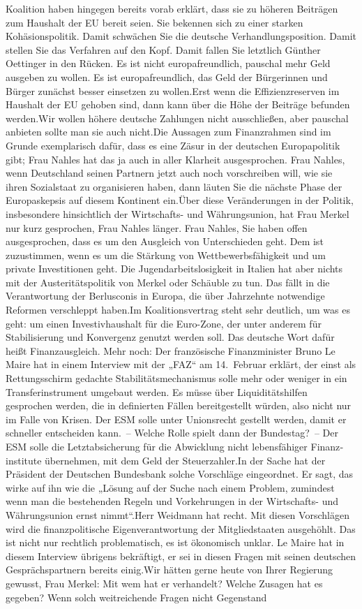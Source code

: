 \documentclass{article}
\begin{document}
Koalition haben hingegen bereits vorab erklärt, dass sie zu höheren Beiträgen zum Haushalt der EU bereit seien. Sie bekennen sich zu einer starken Kohäsionspolitik. Damit schwächen Sie die deutsche Verhandlungsposition. Damit stellen Sie das Verfahren auf den Kopf. Damit fallen Sie letztlich Günther Oettinger in den Rücken. Es ist nicht europafreundlich, pauschal mehr Geld ausgeben zu wollen. Es ist europafreundlich, das Geld der Bürgerinnen und Bürger zunächst besser einsetzen zu wollen.Erst wenn die Effizienzreserven im Haushalt der EU gehoben sind, dann kann über die Höhe der Beiträge befunden werden.Wir wollen höhere deutsche Zahlungen nicht ausschließen, aber pauschal anbieten sollte man sie auch nicht.Die Aussagen zum Finanzrahmen sind im Grunde exemplarisch dafür, dass es eine Zäsur in der deutschen Europapolitik gibt; Frau Nahles hat das ja auch in aller Klarheit ausgesprochen. Frau Nahles, wenn Deutschland seinen Partnern jetzt auch noch vorschreiben will, wie sie ihren Sozialstaat zu organisieren haben, dann läuten Sie die nächste Phase der Europaskepsis auf diesem Kontinent ein.Über diese Veränderungen in der Politik, insbesondere hinsichtlich der Wirtschafts- und Währungsunion, hat Frau Merkel nur kurz gesprochen, Frau Nahles länger. Frau Nahles, Sie haben offen ausgesprochen, dass es um den Ausgleich von Unterschieden geht. Dem ist zuzustimmen, wenn es um die Stärkung von Wettbewerbsfähigkeit und um private Investitionen geht. Die Jugendarbeitslosigkeit in Italien hat aber nichts mit der Austeritätspolitik von Merkel oder Schäuble zu tun. Das fällt in die Verantwortung der Berlusconis in Europa, die über Jahrzehnte notwendige Reformen verschleppt haben.Im Koalitionsvertrag steht sehr deutlich, um was es geht: um einen Investivhaushalt für die Euro-Zone, der unter anderem für Stabilisierung und Konvergenz genutzt werden soll. Das deutsche Wort dafür heißt Finanzausgleich. Mehr noch: Der französische Finanzminister Bruno Le Maire hat in einem Interview mit der „FAZ“ am 14. Februar erklärt, der einst als Rettungsschirm gedachte Stabilitätsmechanismus solle mehr oder weniger in ein Transferinstrument umgebaut werden. Es müsse über Liquiditätshilfen gesprochen werden, die in definierten Fällen bereitgestellt würden, also nicht nur im Falle von Krisen. Der ESM solle unter Unionsrecht gestellt werden, damit er schneller entscheiden kann. – Welche Rolle spielt dann der Bundestag? – Der ESM solle die Letztabsicherung für die Abwicklung nicht lebensfähiger Finanz­institute übernehmen, mit dem Geld der Steuerzahler.In der Sache hat der Präsident der Deutschen Bundesbank solche Vorschläge eingeordnet. Er sagt, das wirke auf ihn wie die „Lösung auf der Suche nach einem Problem, zumindest wenn man die bestehenden Regeln und Vorkehrungen in der Wirtschafts- und Währungsunion ernst nimmt“.Herr Weidmann hat recht. Mit diesen Vorschlägen wird die finanzpolitische Eigenverantwortung der Mitgliedstaaten ausgehöhlt. Das ist nicht nur rechtlich problematisch, es ist ökonomisch unklar. Le Maire hat in diesem Interview übrigens bekräftigt, er sei in diesen Fragen mit seinen deutschen Gesprächspartnern bereits einig.Wir hätten gerne heute von Ihrer Regierung gewusst, Frau Merkel: Mit wem hat er verhandelt? Welche Zusagen hat es gegeben? Wenn solch weitreichende Fragen nicht Gegenstand 
\end{document}
